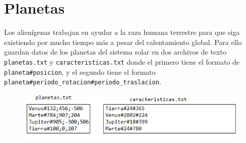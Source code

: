 \section{Planetas}
Los alienígenas trabajan en ayudar a la raza humana terrestre para que siga existiendo por mucho tiempo más a pesar del calentamiento global. Para ello guardan datos de los planetas del sistema solar en dos archivos de texto \texttt{planetas.txt} y \texttt{caracteristicas.txt} donde el primero tiene el formato de \texttt{planeta\#posicion}, y el segundo tiene el formato \texttt{planeta\#periodo\_rotacion\#periodo\_traslacion}.

\begin{figure}[h]
    \centering
    \includegraphics{Imagenes/planetas.png}
    
\end{figure}

